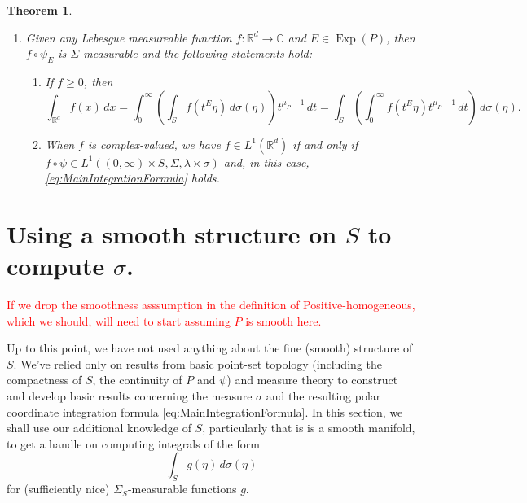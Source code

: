 \documentclass[11pt]{article}
\theoremstyle{theorem}
\newtheorem{theorem}{Theorem}[section]
\newcommand\Exp{\operatorname{Exp}}
\begin{document}
\begin{theorem}
\begin{enumerate}
and, for each $A\in\mathcal{M}_d$,
\begin{equation*}
m(A)=(\lambda\times\sigma)(\psi_E^{-1}(A)).
\end{equation*}
\item\label{item:MainintegrationFormula2} Given any Lebesgue measureable function $f:\mathbb{R}^d\to\mathbb{C}$ and $E\in \Exp(P)$, then $f\circ \psi_E$ is $\Sigma$-measurable and the following statements hold:
\begin{enumerate}
\item If $f\geq 0$, then
\begin{equation}\label{eq:MainIntegrationFormula}
\int_{\mathbb{R}^d}f(x)\,dx=\int_0^\infty\left(\int_S f(t^E\eta)\,d\sigma(\eta)\right)t^{\mu_P-1}\,dt=\int_S\left(\int_0^\infty f(t^E\eta)t^{\mu_P-1}\,dt\right)\,d\sigma(\eta).
\end{equation}
\item When $f$ is complex-valued, we have $f\in L^1(\mathbb{R}^d)$ if and only if $f\circ\psi\in L^1((0,\infty)\times S,\Sigma,\lambda\times\sigma)$ and, in this case, \eqref{eq:MainIntegrationFormula} holds.
\end{enumerate}
\end{enumerate}
\end{theorem}
\section{Using a smooth structure on $S$ to compute $\sigma$.}\label{sec:SigmaForSmoothP}

\textcolor{red}{If we drop the smoothness asssumption in the definition of Positive-homogeneous, which we should, will need to start assuming $P$ is smooth here.}

Up to this point, we have not used anything about the fine (smooth) structure of $S$. We've relied only on results from basic point-set topology (including the compactness of $S$, the continuity of $P$ and $\psi$) and measure theory to construct and develop basic results concerning the measure $\sigma$ and the resulting polar coordinate integration formula \eqref{eq:MainIntegrationFormula}. In this section, we shall use our additional knowledge of $S$, particularly that is is a smooth manifold, to get a handle on computing integrals of the form
\begin{equation*}
\int_S g(\eta)\,d\sigma(\eta)
\end{equation*}
for (sufficiently nice) $\Sigma_S$-measurable functions $g$. 
\end{document}
